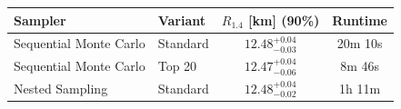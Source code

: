 \renewcommand{\arraystretch}{1.4}
\begin{tabular}{l l c c}
    \hline
    Sampler & Variant & $R_{1.4}$ [km] (90\%) & Runtime \\
    \hline
    Sequential Monte Carlo & Standard & $12.48^{+0.04}_{-0.03}$ & 20m 10s \\
    Sequential Monte Carlo & Top 20 & $12.47^{+0.04}_{-0.06}$ & 8m 46s \\
    Nested Sampling & Standard & $12.48^{+0.04}_{-0.02}$ & 1h 11m \\
    \hline
\end{tabular}
